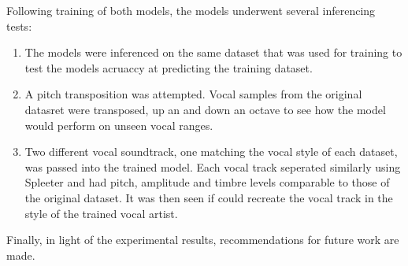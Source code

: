 Following training of both models, the models underwent several inferencing tests:

\begin{enumerate}
    \item The models were inferenced on the same dataset that was used for training to test the models acruaccy at predicting the training dataset.
    \item A pitch transposition was attempted. Vocal samples from the original datasret were transposed, up an and down an octave to see how the model would perform on unseen vocal ranges.
    \item Two different vocal soundtrack, one matching the vocal style of each dataset, was passed into the trained model. Each vocal track seperated similarly using Spleeter and had pitch, amplitude and timbre levels comparable to those of the original dataset. It was then seen if could recreate the vocal track in the style of the trained vocal artist. 
\end{enumerate}

Finally, in light of the experimental results, recommendations for future work are made.